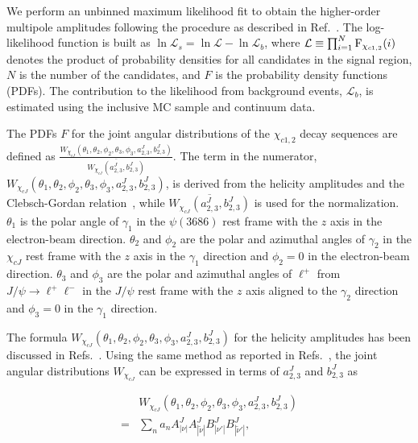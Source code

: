 \documentclass[prd,twocolumn,showpacs,amsmath,amssymb]{revtex4-1}
\begin{document}
We perform an unbinned maximum likelihood fit to obtain the higher-order multipole amplitudes following the procedure as described in Ref.~\cite{BESIII}.
The log-likelihood function is built as $\ln\mathcal{L}_{s} = \ln\mathcal{L}-\ln\mathcal{L}_{b}$, where $\mathcal{L} \equiv \prod_{i=1}^{N}{\rm F}_{\chi_{c1,2}}(i)$
denotes the product of probability densities for all candidates in the signal region, $N$ is the number of the candidates, and $F$ is the probability density functions (PDFs).  The contribution to the likelihood from background events, $\mathcal{L}_{b}$, is estimated using the inclusive MC sample and continuum data.

The PDFs $F$ for the joint angular distributions of the $\chi_{c1,2}$ decay sequences are defined as
$\frac{ W_{\chi_{cJ}}(\theta_{1},\theta_{2},\phi_{2},\theta_{3},\phi_{3},a_{2,3}^{J},b_{2,3}^{J})}{\overline{W_{\chi_{cJ}}(a_{2,3}^{J},b_{2,3}^{J})}}$.
The term in the numerator, $W_{\chi_{cJ}}(\theta_{1},\theta_{2},\phi_{2},\theta_{3},\phi_{3},a_{2,3}^{J},b_{2,3}^{J})$, is derived from the helicity amplitudes
and the Clebsch-Gordan relation~\cite{M2_theory1}, while $\overline{W_{\chi_{cJ}}(a_{2,3}^{J},b_{2,3}^{J})}$ is used for the normalization.
$\theta_{1}$ is the polar angle of $\gamma_1$ in the $\psi(3686)$ rest frame with the $z$ axis in the electron-beam direction.
$\theta_{2}$ and $\phi_{2}$ are the polar and azimuthal angles of $\gamma_{2}$ in the $\chi_{cJ}$ rest frame with the $z$ axis in the $\gamma_{1}$ direction
and $\phi_{2}=0$ in the electron-beam direction. $\theta_{3}$ and $\phi_{3}$ are the polar and azimuthal angles of $\ell^{+}$ from
$J/\psi\rightarrow \ell^{+}\ell^{-}$ in the $J/\psi$ rest frame with the $z$ axis aligned to the $\gamma_{2}$ direction and $\phi_{3}=0$ in the $\gamma_{1}$ direction.

The formula $W_{\chi_{cJ}}(\theta_{1},\theta_{2},\phi_{2},\theta_{3},\phi_{3},a_{2,3}^{J},b_{2,3}^{J})$ for the helicity amplitudes has been discussed
in Refs.~\cite{BESII,CLEO-c,BESIII,amp_012}. Using the same method as reported in Refs.~\cite{BESII,CLEO-c,BESIII}, the joint angular distributions
$W_{\chi_{cJ}}$ can be expressed in terms of $a_{2,3}^{J}$ and $b_{2,3}^{J}$ as

\begin{equation}\label{chic1_func}
\begin{split}
 &W_{\chi_{cJ}}(\theta_{1},\theta_{2},\phi_{2},\theta_{3},\phi_{3},a_{2,3}^{J},b_{2,3}^{J}) \\
 =& \sum_{n}a_{n}A_{|\nu|}^{J}A_{|\widetilde{\nu}|}^{J}B_{|\nu'|}^{J}B_{|\widetilde{\nu}'|}^{J},
\end{split}
\end{equation}
\end{document}
